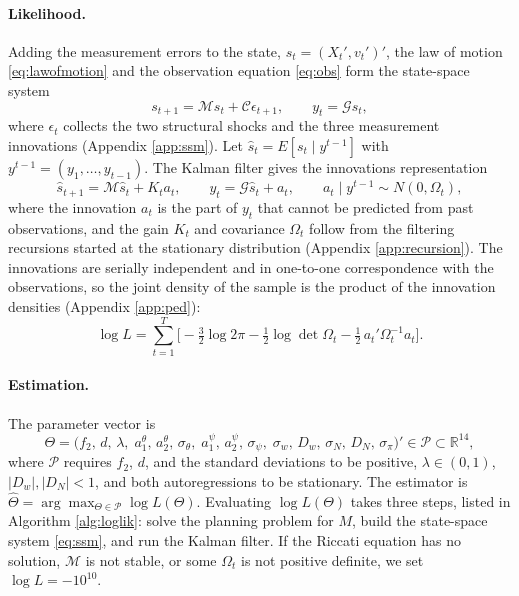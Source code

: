 \documentclass[12pt]{article}
\begin{document}
\paragraph{Likelihood.} Adding the measurement errors to the state, $s_t = (X_t', v_t')'$, the law of motion \eqref{eq:lawofmotion} and the observation equation \eqref{eq:obs} form the state-space system
\begin{equation}\label{eq:ssm}
  s_{t+1} = \mathcal{M} s_t + \mathcal{C} \epsilon_{t+1}, \qquad y_t = \mathcal{G} s_t ,
\end{equation}
where $\epsilon_t$ collects the two structural shocks and the three measurement innovations (Appendix \ref{app:ssm}). Let $\hat{s}_t = E[s_t \mid y^{t-1}]$ with $y^{t-1} = (y_1, \dots, y_{t-1})$. The Kalman filter gives the innovations representation
\begin{equation}\label{eq:innovrep}
  \hat{s}_{t+1} = \mathcal{M}\hat{s}_t + K_t a_t, \qquad y_t = \mathcal{G}\hat{s}_t + a_t , \qquad a_t \mid y^{t-1} \sim N(0, \Omega_t),
\end{equation}
where the innovation $a_t$ is the part of $y_t$ that cannot be predicted from past observations, and the gain $K_t$ and covariance $\Omega_t$ follow from the filtering recursions started at the stationary distribution (Appendix \ref{app:recursion}). The innovations are serially independent and in one-to-one correspondence with the observations, so the joint density of the sample is the product of the innovation densities (Appendix \ref{app:ped}):
\begin{equation}\label{eq:loglik}
  \log L = \sum_{t=1}^{T} \Big[ -\tfrac{3}{2}\log 2\pi - \tfrac12 \log \det \Omega_t - \tfrac12\, a_t' \Omega_t^{-1} a_t \Big] .
\end{equation}

\paragraph{Estimation.} The parameter vector is
\begin{equation}\label{eq:paramvec}
  \Theta = \big(f_2,\, d,\, \lambda,\; a^{\theta}_1,\, a^{\theta}_2,\, \sigma_\theta,\; a^{\psi}_1,\, a^{\psi}_2,\, \sigma_\psi,\; \sigma_w,\, D_w,\, \sigma_N,\, D_N,\, \sigma_\pi\big)' \in \mathcal{P} \subset \mathbb{R}^{14},
\end{equation}
where $\mathcal{P}$ requires $f_2$, $d$, and the standard deviations to be positive, $\lambda \in (0,1)$, $|D_w|, |D_N| < 1$, and both autoregressions to be stationary. The estimator is $\hat\Theta = \arg\max_{\Theta \in \mathcal{P}} \log L(\Theta)$. Evaluating $\log L(\Theta)$ takes three steps, listed in Algorithm \ref{alg:loglik}: solve the planning problem for $M$, build the state-space system \eqref{eq:ssm}, and run the Kalman filter. If the Riccati equation has no solution, $\mathcal{M}$ is not stable, or some $\Omega_t$ is not positive definite, we set $\log L = -10^{10}$.
\end{document}
